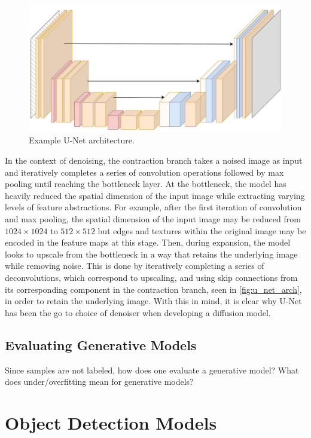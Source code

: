 \documentclass[11pt]{article}
\begin{document}
\begin{figure}[t]
    \centering
    \includegraphics[width=\columnwidth]{./figures/generative_models/unet.png}
    \caption{Example U-Net architecture.}
    \label{fig:u_net_arch}
\end{figure}

In the context of denoising, the contraction branch takes a noised image as input and iteratively completes a series of convolution operations followed by max pooling until reaching the bottleneck layer. At the bottleneck, the model has heavily reduced the spatial dimension of the input image while extracting varying levels of feature abstractions. For example, after the first iteration of convolution and max pooling, the spatial dimension of the input image may be reduced from $1024\times1024$ to $512\times512$ but edges and textures within the original image may be encoded in the feature maps at this stage. Then, during expansion, the model looks to upscale from the bottleneck in a way that retains the underlying image while removing noise. This is done by iteratively completing a series of deconvolutions, which correspond to upscaling, and using skip connections from its corresponding component in the contraction branch, seen in \autoref{fig:u_net_arch}, in order to retain the underlying image. With this in mind, it is clear why U-Net has been the go to choice of denoiser when developing a diffusion model.

\subsection{\TODO{: }Evaluating Generative Models}
Since samples are not labeled, how does one evaluate a generative model? What does under/overfitting mean for generative models?

\section{Object Detection Models}
\end{document}

